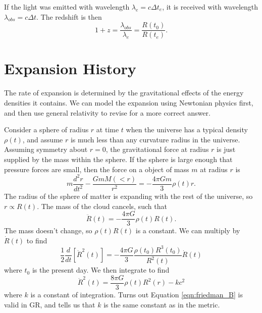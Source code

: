 \documentclass[]{article}
\begin{document}
If the light was emitted with wavelength $\lambda_e = c \Delta t_e$, it is
received with wavelength $\lambda_{obs} = c \Delta t$.  The
redshift is then
\begin{equation}
1 + z = \frac{\lambda_{obs}}{\lambda_e} = \frac{R(t_0)}{R(t_e)}.
\end{equation}

\section{Expansion History}

The rate of expansion is determined by the gravitational effects
of the energy densities it contains.  We can model the expansion
using Newtonian physics first, and then use general relativity
to revise for a more correct answer.

Consider a sphere of radius $r$ at time $t$ when the 
universe has a typical density $\rho(t)$, and assume
$r$ is much less than any curvature radius in the 
universe.  Assuming symmetry about $r=0$, the
gravitational force at radius $r$ is just supplied by the
mass within the sphere.  If the sphere
is large enough that pressure forces are small, then
the force on a object of mass $m$ at radius $r$ is
\begin{equation}
m \frac{d^2 r}{dt^2} - \frac{G m M(<r)}{r^2} = - \frac{4\pi Gm}{3}\rho(t)r.
\end{equation}
\noindent
The radius of the sphere of matter is expanding with the
rest of the universe, so $r\propto R(t)$.  The mass of the
cloud cancels, such that
\begin{equation}
\label{eqn:friedman_A}
\ddot{R}(t) = - \frac{4\pi G}{3} \rho(t) R(t).
\end{equation}
\noindent
The mass doesn't change, so $\rho(t) R(t)$ is a constant.
We can multiply by $\dot{R}(t)$ to find
\begin{equation}
\frac{1}{2} \frac{d}{dt}[\dot{R}^2(t)] = - \frac{4 \pi G}{3} \frac{\rho(t_0)R^3(t_0)}{R^2(t)} \dot{R}(t)
\end{equation}
\noindent
where $t_0$ is the present day.  We then integrate to find
\begin{equation}
\label{eqn:friedman_B}
\dot{R}^2(t) = \frac{8\pi G}{3}\rho(t) R^2(r) - kc^2
\end{equation}
\noindent
where $k$ is a constant of integration.  Turns out Equation
\ref{eqn:friedman_B} is valid in GR, and tells us
that $k$ is the same constant as in the metric.
\end{document}
